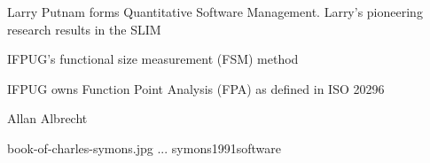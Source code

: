 \documentclass{article}
\begin{document}


Larry Putnam forms Quantitative Software Management. Larry’s pioneering research results in the SLIM

IFPUG's functional size measurement (FSM) method

IFPUG owns Function Point Analysis (FPA) as defined in ISO 20296

Allan Albrecht

\qte
  {book-of-charles-symons.jpg}
  {...}
  {symons1991software}


\end{document}
